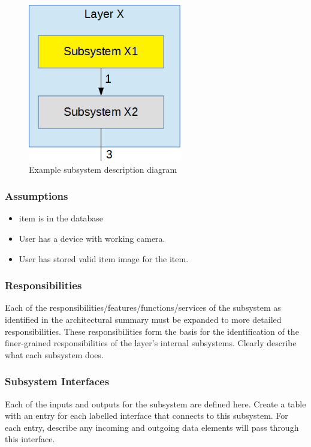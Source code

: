 \begin{figure}[h!]
	\centering
 	\includegraphics[width=0.60\textwidth]{images/subsystem}
 \caption{Example subsystem description diagram}
\end{figure}

\subsubsection{Assumptions}
\begin{itemize}
    \item item is in the database
    \item User has a device with working camera.
    \item User has stored valid item image for the item.
\end{itemize}

\subsubsection{Responsibilities}
Each of the responsibilities/features/functions/services of the subsystem as identified in the architectural summary must be expanded to more detailed responsibilities. These responsibilities form the basis for the identification of the finer-grained responsibilities of the layer's internal subsystems. Clearly describe what each subsystem does.

\subsubsection{Subsystem Interfaces}
Each of the inputs and outputs for the subsystem are defined here. Create a table with an entry for each labelled interface that connects to this subsystem. For each entry, describe any incoming and outgoing data elements will pass through this interface.

